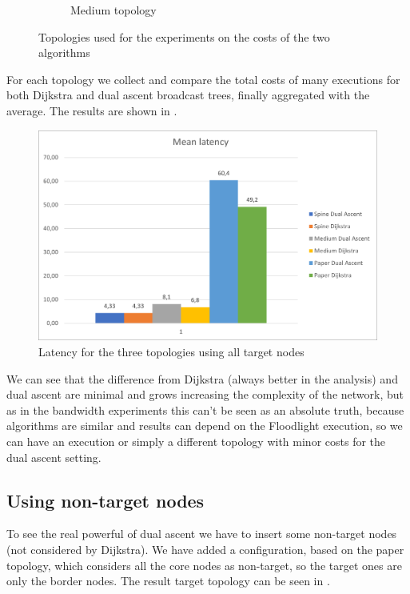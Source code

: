 \begin{figure}
\begin{subfigure}[b]{0.45\textwidth}
		\caption{Medium topology}\label{subfig:mediumtopo}
	\end{subfigure}
	\caption{Topologies used for the experiments on the costs of the two
	algorithms}\label{fig:othertopologies}
\end{figure}

For each topology we collect and compare the total costs of many executions for
both Dijkstra and dual ascent broadcast trees, finally aggregated with the
average. The results are shown in .

\begin{figure}
	\centering
	\includegraphics[width=\textwidth]{img/lat-mean-all.png}
	\caption{Latency for the three topologies using all target
	nodes}\label{fig:avg-latency}
\end{figure}

We can see that the difference from Dijkstra (always better in the analysis) and
dual ascent are minimal and grows increasing the complexity of the network, but
as in the bandwidth experiments this can't be seen as an absolute truth, because
algorithms are similar and results can depend on the Floodlight execution, so we
can have an execution or simply a different topology with minor costs for the
dual ascent setting.

\subsection{Using non-target nodes}

To see the real powerful of dual ascent we have to insert some non-target nodes
(not considered by Dijkstra). We have added a configuration, based on the paper
topology, which considers all the core nodes as non-target, so the target ones
are only the border nodes. The result target topology can be seen in
.

